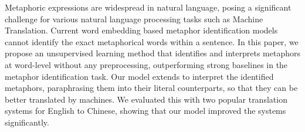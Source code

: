 Metaphoric expressions are widespread in natural language, posing a significant challenge for various natural language processing tasks such as Machine Translation. Current word embedding based metaphor identification models cannot identify the exact metaphorical words within a sentence. In this paper, we propose an unsupervised learning method that identifies and interprets metaphors at word-level without any preprocessing, outperforming strong baselines in the metaphor identification task. Our model extends to interpret the identified metaphors, paraphrasing them into their literal counterparts, so that they can be better translated by machines. We evaluated this with two popular translation systems for English to Chinese, showing that our model improved the systems significantly.
